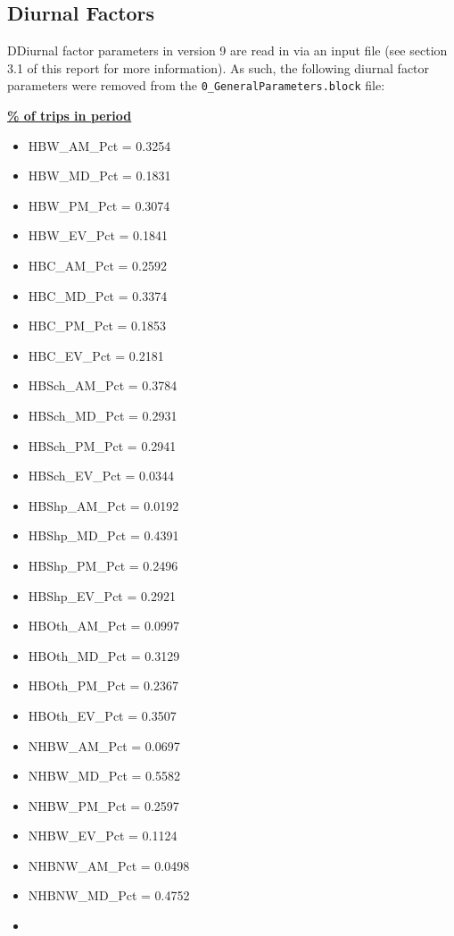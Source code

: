 \documentclass[
  letterpaper,
  DIV=11,
  numbers=noendperiod]{scrreprt}
\providecommand{\tightlist}{%
  \setlength{\itemsep}{0pt}\setlength{\parskip}{0pt}}\usepackage{longtable,booktabs,array}
\begin{document}
\hypertarget{diurnal-factors}{%
\subsection{Diurnal Factors}\label{diurnal-factors}}

DDiurnal factor parameters in version 9 are read in via an input file
(see section 3.1 of this report for more information). As such, the
following diurnal factor parameters were removed from the
\texttt{0\_GeneralParameters.block} file:

\textbf{\underline{\% of trips in period}}

\begin{itemize}
\tightlist
\item
  HBW\_AM\_Pct = 0.3254
\item
  HBW\_MD\_Pct = 0.1831
\item
  HBW\_PM\_Pct = 0.3074
\item
  HBW\_EV\_Pct = 0.1841
\item
  HBC\_AM\_Pct = 0.2592
\item
  HBC\_MD\_Pct = 0.3374
\item
  HBC\_PM\_Pct = 0.1853
\item
  HBC\_EV\_Pct = 0.2181
\item
  HBSch\_AM\_Pct = 0.3784
\item
  HBSch\_MD\_Pct = 0.2931
\item
  HBSch\_PM\_Pct = 0.2941
\item
  HBSch\_EV\_Pct = 0.0344
\item
  HBShp\_AM\_Pct = 0.0192
\item
  HBShp\_MD\_Pct = 0.4391
\item
  HBShp\_PM\_Pct = 0.2496
\item
  HBShp\_EV\_Pct = 0.2921
\item
  HBOth\_AM\_Pct = 0.0997
\item
  HBOth\_MD\_Pct = 0.3129
\item
  HBOth\_PM\_Pct = 0.2367
\item
  HBOth\_EV\_Pct = 0.3507
\item
  NHBW\_AM\_Pct = 0.0697
\item
  NHBW\_MD\_Pct = 0.5582
\item
  NHBW\_PM\_Pct = 0.2597
\item
  NHBW\_EV\_Pct = 0.1124
\item
  NHBNW\_AM\_Pct = 0.0498
\item
  NHBNW\_MD\_Pct = 0.4752
\item

\end{itemize}
\end{document}
